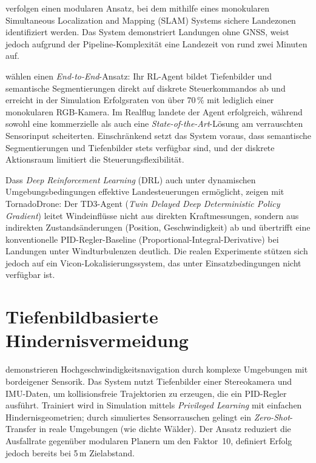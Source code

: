 \textcite{yangMonocularVisionSLAMBased2018} verfolgen einen modularen Ansatz, bei dem mithilfe eines monokularen Simultaneous Localization and Mapping (SLAM) Systems sichere Landezonen identifiziert werden. Das System demonstriert Landungen ohne GNSS, weist jedoch aufgrund der Pipeline-Komplexität eine Landezeit von rund zwei Minuten auf.

\textcite{bartolomeiAutonomousEmergencyLanding2022} wählen einen \textit{End-to-End}-Ansatz: Ihr RL-Agent bildet Tiefenbilder und semantische Segmentierungen direkt auf diskrete Steuerkommandos ab und erreicht in der Simulation Erfolgsraten von über 70\,\% mit lediglich einer monokularen RGB-Kamera. Im Realflug landete der Agent erfolgreich, während sowohl eine kommerzielle als auch eine \textit{State-of-the-Art}-Lösung am verrauschten Sensorinput scheiterten. Einschränkend setzt das System voraus, dass semantische Segmentierungen und Tiefenbilder stets verfügbar sind, und der diskrete Aktionsraum limitiert die Steuerungsflexibilität.

Dass \textit{Deep Reinforcement Learning} (DRL) auch unter dynamischen Umgebungsbedingungen effektive Landesteuerungen ermöglicht, zeigen \textcite{peterTornadoDroneBioinspiredDRLbased2024} mit TornadoDrone: Der TD3-Agent (\textit{Twin Delayed Deep Deterministic Policy Gradient}) leitet Windeinflüsse nicht aus direkten Kraftmessungen, sondern aus indirekten Zustandsänderungen (Position, Geschwindigkeit) ab und übertrifft eine konventionelle PID-Regler-Baseline (Proportional-Integral-Derivative) bei Landungen unter Windturbulenzen deutlich. Die realen Experimente stützen sich jedoch auf ein Vicon-Lokalisierungssystem, das unter Einsatzbedingungen nicht verfügbar ist.

\section{Tiefenbildbasierte Hindernisvermeidung}
\label{sec:tiefenbild-oa}

\textcite{loquercioLearningHighspeedFlight2021} demonstrieren Hochgeschwindigkeitsnavigation durch komplexe Umgebungen mit bordeigener Sensorik. Das System nutzt Tiefenbilder einer Stereokamera und IMU-Daten, um kollisionsfreie Trajektorien zu erzeugen, die ein PID-Regler ausführt. Trainiert wird in Simulation mittels \textit{Privileged Learning} mit einfachen Hindernisgeometrien; durch simuliertes Sensorrauschen gelingt ein \textit{Zero-Shot}-Transfer in reale Umgebungen (wie dichte Wälder). Der Ansatz reduziert die Ausfallrate gegenüber modularen Planern um den Faktor~10, definiert Erfolg jedoch bereits bei 5\,m Zielabstand.

